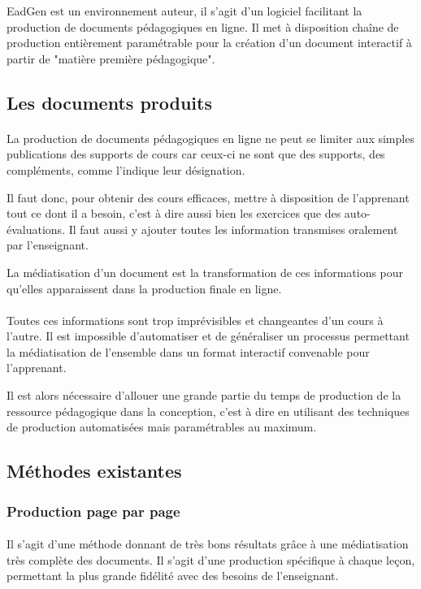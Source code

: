 EadGen est un environnement auteur, il s'agit d'un logiciel facilitant la production de documents pédagogiques en ligne. Il met à disposition chaîne de production entièrement paramétrable pour la création d'un document interactif à partir de "matière première pédagogique".

\subsection{Les documents produits}

\paragraph{}La production de documents pédagogiques en ligne ne peut se limiter aux simples publications des supports de cours car ceux-ci ne sont que des supports, des compléments, comme l'indique leur désignation. 

Il faut donc, pour obtenir des cours efficaces, mettre à disposition de l'apprenant tout ce dont il a besoin, c'est à dire aussi bien les exercices que des auto-évaluations. Il faut aussi y ajouter toutes les information transmises oralement par l'enseignant. 

La médiatisation d'un document est la transformation de ces informations pour qu'elles apparaissent dans la production finale en ligne. 

\paragraph{}Toutes ces informations sont trop imprévisibles et changeantes d'un cours à l'autre. Il est impossible d'automatiser et de généraliser un processus permettant la médiatisation de l'ensemble dans un format interactif convenable pour l'apprenant. 

Il est alors nécessaire d’allouer une grande partie du temps de production de la ressource pédagogique dans la conception, c'est à dire en utilisant des techniques de production automatisées mais paramétrables au maximum.

\subsection{Méthodes existantes}
\subsubsection{Production page par page}
\paragraph{}Il s'agit d'une méthode donnant de très bons résultats grâce à une médiatisation très complète des documents. Il s'agit d'une production spécifique à chaque leçon, permettant la plus grande fidélité avec des besoins de l'enseignant. 

